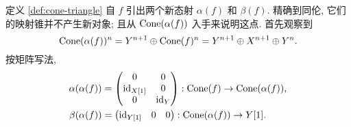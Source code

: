 定义 \ref{def:cone-triangle} 自 $f$ 引出两个新态射 $\alpha(f)$ 和 $\beta(f)$. 精确到同伦, 它们的映射锥并不产生新对象; 且从 $\operatorname{Cone}(\alpha(f))$ 入手来说明这点. 首先观察到
\[ \operatorname{Cone}(\alpha(f))^n = Y^{n+1} \oplus \operatorname{Cone}(f)^n = Y^{n+1} \oplus X^{n+1} \oplus Y^n. \]
按矩阵写法,
\begin{align*}
	\alpha(\alpha(f)) & = \begin{pmatrix}
		0 & 0 \\
		\mathrm{id}_{X[1]} & 0 \\
		0 & \mathrm{id}_Y
	\end{pmatrix} : \operatorname{Cone}(f) \to \operatorname{Cone}(\alpha(f)) , \\
	\beta(\alpha(f)) & = \begin{pmatrix}
		\mathrm{id}_{Y[1]} & 0 & 0
	\end{pmatrix} : \operatorname{Cone}(\alpha(f)) \to Y[1].
\end{align*}

